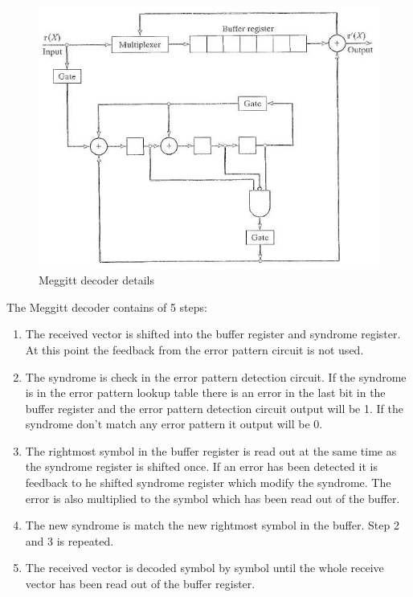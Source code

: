\documentclass[Main]{subfiles}
\begin{document}
\begin{figure}[h!]
\centering
\includegraphics[width=0.7\linewidth]{./Picture/Meggitt_decoder_example}
\caption[Meggit Decoder example]{Meggitt decoder details}
\label{fig:Meggitt_decoder_example}
\end{figure}
The Meggitt decoder contains of 5 steps:
\begin{enumerate}
\item The received vector is shifted into the buffer register and syndrome register.
At this point the feedback from the error pattern circuit is not used.
\item The syndrome is check in the error pattern detection circuit.
If the syndrome is in the error pattern lookup table there is an error in the last bit in the buffer register and the error pattern detection circuit output will be 1.
If the syndrome don't match any error pattern it output will be 0.
\item The rightmost symbol in the buffer register is read out at the same time as the syndrome register is shifted once.
If an error has been detected it is feedback to he shifted syndrome register which modify the syndrome.
The error is also multiplied to the symbol which has been read out of the buffer. 
\item The new syndrome is match the new rightmost symbol in the buffer.
Step 2 and 3 is repeated.
\item The received vector is decoded symbol by symbol until the whole receive vector has been read out of the buffer register.
\end{enumerate}
\end{document}
